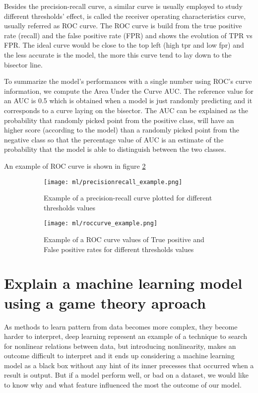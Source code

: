 \documentclass[10pt]{report}
\begin{document}
Besides the precision-recall curve, a similar curve is usually employed to study different thresholds' effect, is called the receiver operating characteristics curve, usually referred as ROC curve.
The ROC curve is build from the true positive rate (recall) and the false positive rate (FPR) and shows the evolution of TPR vs FPR.
The ideal curve would be close to the top left (high tpr and low fpr) and the less accurate is the model, the more this curve tend to lay down to the bisector line.

To summarize the model's performances with a single number using ROC's curve information, we compute the Area Under the Curve AUC.
The reference value for an AUC is 0.5 which is obtained when a model is just randomly predicting and it corresponds to a curve laying on the bisector.
The AUC can be explained as the probability that randomly picked point from the positive class, will have an higher score (according to the model) than a randomly picked point from the negative class so that the percentage value of AUC is an estimate of the probability that the model is able to distinguish between the two classes.

An example of ROC curve is shown in figure \ref{fig:roccurve}


\begin{figure}
\centering
\begin{subfigure}{0.4\textwidth}
\texttt{[image: ml/precisionrecall\_example.png]}
\caption{Example of a precision-recall curve plotted for different thresholds values}
\label{fig:precisionrecall}
\end{subfigure}
\begin{subfigure}{0.4\textwidth}
\texttt{[image: ml/roccurve\_example.png]}
\caption{Example of a ROC curve values of True positive and False positive rates for different thresholds values}
\label{fig:roccurve}
\end{subfigure}
\caption{}
\label{}
\end{figure}



\chapter{Explain a machine learning model using a game theory aproach}

As methods to learn pattern from data becomes more complex, they become harder to interpret, deep learning represent an example of a technique to search for nonlinear relations between data, but introducing nonlinearity, makes an outcome difficult to interpret and it ends up considering a machine learning model as a black box without any hint of its inner precesses that occurred when a result is output. But if a model perform well, or bad on a dataset, we would like to know why and what feature influenced the most the outcome of our model.
\end{document}
